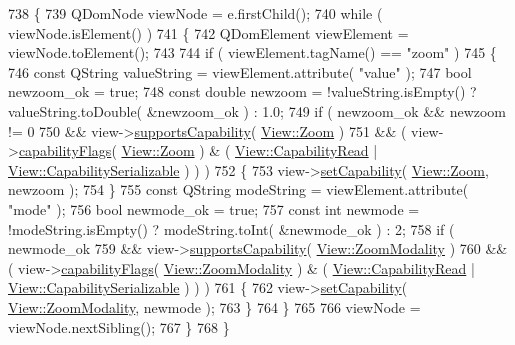 \begin{DoxyCode}
738 \{
739     QDomNode viewNode = e.firstChild();
740     \textcolor{keywordflow}{while} ( viewNode.isElement() )
741     \{
742         QDomElement viewElement = viewNode.toElement();
743 
744         \textcolor{keywordflow}{if} ( viewElement.tagName() == \textcolor{stringliteral}{"zoom"} )
745         \{
746             \textcolor{keyword}{const} QString valueString = viewElement.attribute( \textcolor{stringliteral}{"value"} );
747             \textcolor{keywordtype}{bool} newzoom\_ok = \textcolor{keyword}{true};
748             \textcolor{keyword}{const} \textcolor{keywordtype}{double} newzoom = !valueString.isEmpty() ? valueString.toDouble( &newzoom\_ok ) : 1.0;
749             \textcolor{keywordflow}{if} ( newzoom\_ok && newzoom != 0
750                  && view->\hyperlink{classOkular_1_1View_a65d4511363fe5a1fb836a26688bea50c}{supportsCapability}( \hyperlink{classOkular_1_1View_ad95d365554715eb1eabb79350f51b294a3fa37aa9737e4a0f9753aa398c30f667}{View::Zoom} )
751                  && ( view->\hyperlink{classOkular_1_1View_abad9d21eaeb248a4b6712aa5cd0ab6fc}{capabilityFlags}( \hyperlink{classOkular_1_1View_ad95d365554715eb1eabb79350f51b294a3fa37aa9737e4a0f9753aa398c30f667}{View::Zoom} ) & ( 
      \hyperlink{classOkular_1_1View_a8552668497a612628f53b5010df7a45ea129d96c4ba7ee8cc9bf91a544d07bcd3}{View::CapabilityRead} | \hyperlink{classOkular_1_1View_a8552668497a612628f53b5010df7a45eac0b7ffc919ca2416425d9b81b7fef5d9}{View::CapabilitySerializable} ) ) )
752             \{
753                 view->\hyperlink{classOkular_1_1View_a8a6fa965fa025331f2653c529a60eafe}{setCapability}( \hyperlink{classOkular_1_1View_ad95d365554715eb1eabb79350f51b294a3fa37aa9737e4a0f9753aa398c30f667}{View::Zoom}, newzoom );
754             \}
755             \textcolor{keyword}{const} QString modeString = viewElement.attribute( \textcolor{stringliteral}{"mode"} );
756             \textcolor{keywordtype}{bool} newmode\_ok = \textcolor{keyword}{true};
757             \textcolor{keyword}{const} \textcolor{keywordtype}{int} newmode = !modeString.isEmpty() ? modeString.toInt( &newmode\_ok ) : 2;
758             \textcolor{keywordflow}{if} ( newmode\_ok
759                  && view->\hyperlink{classOkular_1_1View_a65d4511363fe5a1fb836a26688bea50c}{supportsCapability}( 
      \hyperlink{classOkular_1_1View_ad95d365554715eb1eabb79350f51b294a2621c21053805b1e2f71fdeb069f9c35}{View::ZoomModality} )
760                  && ( view->\hyperlink{classOkular_1_1View_abad9d21eaeb248a4b6712aa5cd0ab6fc}{capabilityFlags}( \hyperlink{classOkular_1_1View_ad95d365554715eb1eabb79350f51b294a2621c21053805b1e2f71fdeb069f9c35}{View::ZoomModality} ) & ( 
      \hyperlink{classOkular_1_1View_a8552668497a612628f53b5010df7a45ea129d96c4ba7ee8cc9bf91a544d07bcd3}{View::CapabilityRead} | \hyperlink{classOkular_1_1View_a8552668497a612628f53b5010df7a45eac0b7ffc919ca2416425d9b81b7fef5d9}{View::CapabilitySerializable} ) ) )
761             \{
762                 view->\hyperlink{classOkular_1_1View_a8a6fa965fa025331f2653c529a60eafe}{setCapability}( \hyperlink{classOkular_1_1View_ad95d365554715eb1eabb79350f51b294a2621c21053805b1e2f71fdeb069f9c35}{View::ZoomModality}, newmode );
763             \}
764         \}
765 
766         viewNode = viewNode.nextSibling();
767     \}
768 \}
\end{DoxyCode}
